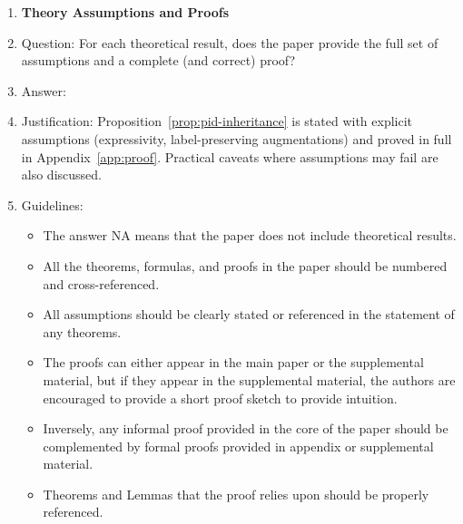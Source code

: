 \documentclass{article}
\theoremstyle{plain}
\theoremstyle{definition}
\begin{document}
\begin{enumerate}
  \item {\bf Theory Assumptions and Proofs}
  \item[] Question: For each theoretical result, does the paper provide the full set of assumptions and a complete (and correct) proof?
  \item[] Answer: \answerYes{}
  \item[] Justification: Proposition~\ref{prop:pid-inheritance} is stated with explicit assumptions (expressivity, label-preserving augmentations) and proved in full in Appendix~\ref{app:proof}. Practical caveats where assumptions may fail are also discussed.
  \item[] Guidelines:
    \begin{itemize}
      \item The answer NA means that the paper does not include theoretical results.
      \item All the theorems, formulas, and proofs in the paper should be numbered and cross-referenced.
      \item All assumptions should be clearly stated or referenced in the statement of any theorems.
      \item The proofs can either appear in the main paper or the supplemental material, but if they appear in the supplemental material, the authors are encouraged to provide a short proof sketch to provide intuition.
      \item Inversely, any informal proof provided in the core of the paper should be complemented by formal proofs provided in appendix or supplemental material.
      \item Theorems and Lemmas that the proof relies upon should be properly referenced.
    \end{itemize}


\end{enumerate}
\end{document}
